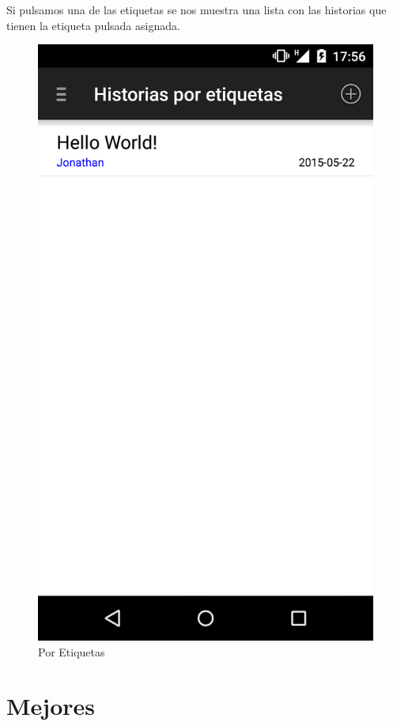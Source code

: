 \documentclass[11pt,a4paper, titlepage]{article}
\begin{document}
	Si pulsamos una de las etiquetas se nos muestra una lista con las historias que tienen la etiqueta pulsada asignada.
	
	\begin{figure}[hbtp]
		\centering
		\includegraphics[scale = 0.25 ]{img/7}
		\caption{Por Etiquetas}
		\label{p1}
	\end{figure}
	
	\section[Mejores]{Mejores}
	
\end{document}

